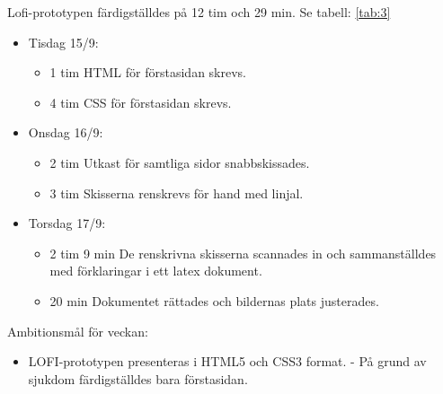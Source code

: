 \documentclass{TDP003mall}
\begin{document}
Lofi-prototypen färdigställdes på 12 tim och 29 min. Se tabell: \ref{tab:3}
\begin{itemize}
  \item Tisdag 15/9:
  \begin{itemize}
    \item 1 tim HTML för förstasidan skrevs.
    \item 4 tim CSS för förstasidan skrevs.
  \end{itemize}
  \item Onsdag 16/9:
  \begin{itemize}
    \item 2 tim Utkast för samtliga sidor snabbskissades.
    \item 3 tim Skisserna renskrevs för hand med linjal.
  \end{itemize}
  \item Torsdag 17/9:
  \begin{itemize}
    \item 2 tim 9 min De renskrivna skisserna scannades in och sammanställdes med förklaringar i ett latex dokument.
    \item 20 min Dokumentet rättades och bildernas plats justerades.
  \end{itemize}
\end{itemize}


Ambitionsmål för veckan:
\begin{itemize}
  \item LOFI-prototypen presenteras i HTML5 och CSS3 format. - På grund av sjukdom färdigställdes bara förstasidan.
  \end{itemize}
  

\newpage

  
\end{document}
